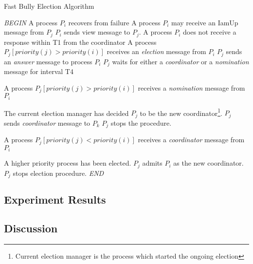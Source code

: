 \documentclass[dareport.tex]{subfiles}
\begin{document}
\begin{algorithm}[H]
	\caption{Fast Bully Election Algorithm}
	\label{fast-bully-algorithm}
	\begin{algorithmic}[1]
		\BState \emph{BEGIN}
		\State A process $P_{i}$ recovers from failure
			\State\indent{}
		\State A process $P_{i}$ may receive an IamUp message from $P_{j}$
			\State\indent $P_{i}$ sends view message to $P_{j}$.
		\State A process $P_{i}$ does not receive a response within T1 from the coordinator
			\State\indent{}
		\State A process $P_{j} \left[priority(j) > priority(i)\right]$ receives an \emph{election} message from $P_{i}$
			\State\indent $P_{j}$ sends an \emph{answer} message to process $P_{i}$
			\State\indent $P_{j}$ waits for either a \emph{coordinator} or a \emph{nomination} message for interval T4
				\State{}
			\Else
			\EndIf
			
			\State A process $P_{j} \left[priority(j) > priority(i)\right]$ receives a \emph{nomination} message from $P_{i}$
			
			\Comment The current election manager has decided $P_{j}$ to be the new coordinator\footnote{Current election manager is the process which started the ongoing election}.
				\State $P_{j}$ sends \emph{coordinator} message to $P_{k}$
				\State $P_{j}$ stops the procedure.
			\EndFor
			
			\State A process $P_{j} \left[priority(j) < priority(i)\right]$ receives a \emph{coordinator} message from $P_{i}$
			
			\Comment A higher priority process has been elected.
			\State\indent $P_{j}$ admits $P_{i}$ as the new coordinator.
			\State\indent $P_{j}$ stops election procedure.
		\BState \emph{END}
	\end{algorithmic}
\end{algorithm}
\subsection{Experiment Results}
\subsection{Discussion}
\end{document}
